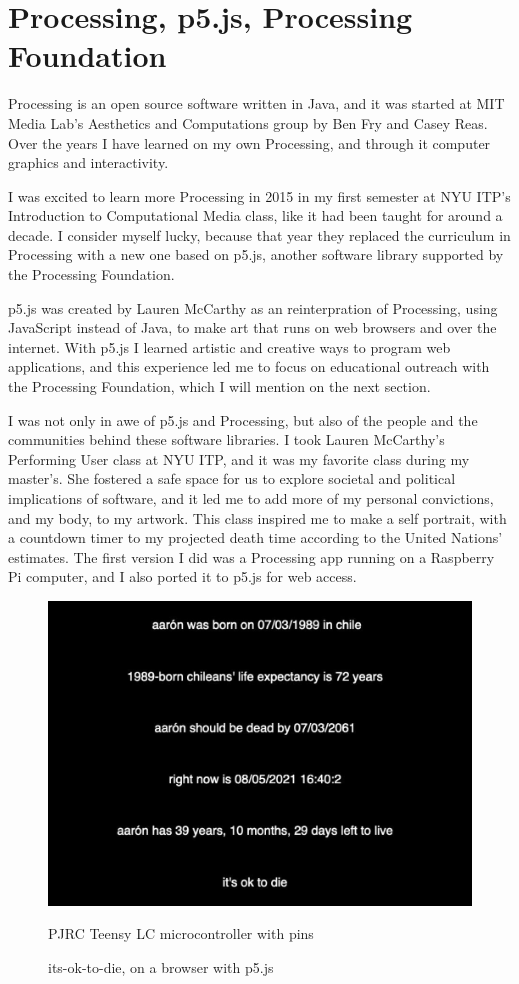 \section{Processing, p5.js, Processing Foundation}

Processing is an open source software written in Java, and it was started at MIT Media Lab's Aesthetics and Computations group by Ben Fry and Casey Reas. Over the years I have learned on my own Processing, and through it computer graphics and interactivity.

I was excited to learn more Processing in 2015 in my first semester at \acrshort{NYU} \acrshort{ITP}'s Introduction to Computational Media class, like it had been taught for around a decade. I consider myself lucky, because that year they replaced the curriculum in Processing with a new one based on p5.js, another software library supported by the Processing Foundation.

p5.js was created by Lauren McCarthy as an reinterpration of Processing, using JavaScript instead of Java, to make art that runs on web browsers and over the internet. With p5.js I learned artistic and creative ways to program web applications, and this experience led me to focus on educational outreach with the Processing Foundation, which I will mention on the next section.

I was not only in awe of p5.js and Processing, but also of the people and the communities behind these software libraries. I took Lauren McCarthy's Performing User class \cite{website-nyu-itp-lauren-mccarthy-performing-user} at \acrshort{NYU} \acrshort{ITP}, and it was my favorite class during my master's. She fostered a safe space for us to explore societal and political implications of software, and it led me to add more of my personal convictions, and my body, to my artwork. This class inspired me to make a self portrait, with a countdown timer to my projected death time according to the United Nations' estimates. The first version I did was a Processing app running on a Raspberry Pi computer, and I also ported it to p5.js for web access.

\begin{figure}[ht]
  \centering
  \includegraphics[width=0.75\linewidth,height=0.35\textheight,keepaspectratio]{images/its-ok-to-die-p5js.jpg}
  \caption{PJRC Teensy LC microcontroller with pins}
  \caption*{its-ok-to-die, on a browser with p5.js}
  \label{fig:its-ok-to-die-p5js}
\end{figure}

